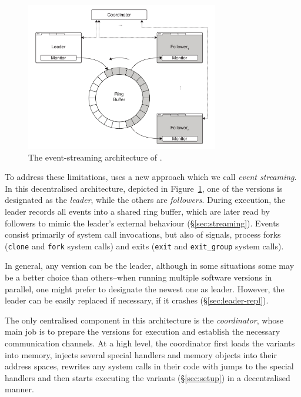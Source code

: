 \begin{figure}[t]
  \begin{center}
    \includegraphics[width=0.75\textwidth]{efficient-execution/figures/architecture}
    \caption{The event-streaming architecture of \varan.}
    \label{fig:architecture}
  \end{center}
\end{figure}

To address these limitations, \varan uses a new approach which we call
\emph{event streaming}.  In this decentralised architecture,
depicted in Figure~\ref{fig:architecture}, one of the
versions is designated as the \textit{leader}, while the others are
\textit{followers}. During execution, the leader records all events into a
shared ring buffer, which are later read by followers to mimic the leader's
external behaviour (\S\ref{sec:streaming}). Events consist primarily of system
call invocations, but also of signals, process forks (\ie \lstinline`clone`
and \lstinline`fork` system calls) and exits (\ie \lstinline`exit` and
\lstinline`exit_group` system calls).

In general, any version can be the leader, although in some situations
some may be a better choice than others--\eg when running multiple
software versions in parallel, one might prefer to designate the
newest one as leader.  However, the leader can be easily replaced if
necessary, \eg if it crashes (\S\ref{sec:leader-repl}).

The only centralised component in this architecture is the
\textit{coordinator}, whose main job is to prepare the versions for
execution and establish the necessary communication channels.  At a
high level, the coordinator first loads the variants into memory,
injects several special handlers and memory objects into their address
spaces, rewrites any system calls in their code with jumps to the
special handlers and then starts executing the variants
(\S\ref{sec:setup}) in a decentralised manner.

